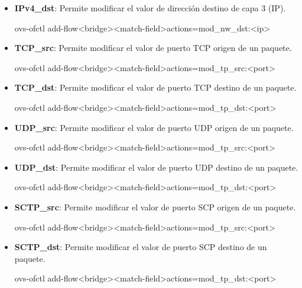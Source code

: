 \begin{itemize}
\item \textbf{IPv4\_dst}: Permite modificar el valor de direcci\'on destino de capa 3 (IP).

\begin{center}
ovs-ofctl add-flow<bridge><match-field>actions=mod\_nw\_dst:<ip>
\end{center}


\item \textbf{TCP\_src}: Permite modificar el valor de puerto TCP origen de un paquete.

\begin{center}
ovs-ofctl add-flow<bridge><match-field>actions=mod\_tp\_src:<port>
\end{center}

\item \textbf{TCP\_dst}: Permite modificar el valor de puerto TCP destino de un paquete. 

\begin{center}
ovs-ofctl add-flow<bridge><match-field>actions=mod\_tp\_dst:<port>
\end{center}

\item \textbf{UDP\_src}: Permite modificar el valor de puerto UDP origen de un paquete.

\begin{center}
ovs-ofctl add-flow<bridge><match-field>actions=mod\_tp\_src:<port>
\end{center}
                   
\item \textbf{UDP\_dst}: Permite modificar el valor de puerto UDP destino de un paquete.

\begin{center}
ovs-ofctl add-flow<bridge><match-field>actions=mod\_tp\_dst:<port>
\end{center}

\item \textbf{SCTP\_src}: Permite modificar el valor de puerto SCP origen de un paquete.

\begin{center}
ovs-ofctl add-flow<bridge><match-field>actions=mod\_tp\_src:<port>
\end{center}
                         
\item \textbf{SCTP\_dst}: Permite modificar el valor de puerto SCP destino de un paquete.

\begin{center}
ovs-ofctl add-flow<bridge><match-field>actions=mod\_tp\_dst:<port>
\end{center}
                            

\end{itemize}
